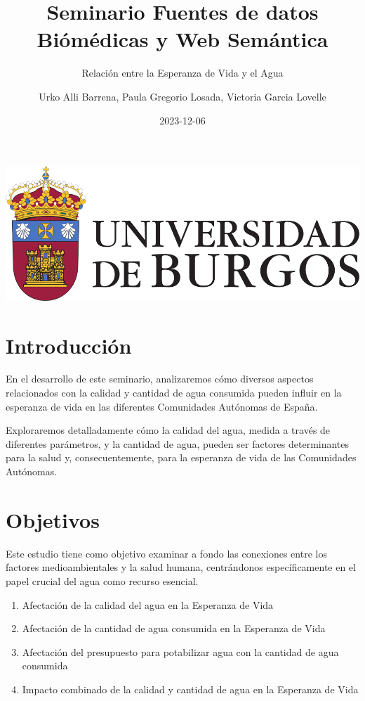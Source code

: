 \documentclass[
]{article}
\title{Seminario Fuentes de datos Biómédicas y Web Semántica}
\subtitle{Relación entre la Esperanza de Vida y el Agua}
\author{Urko Alli Barrena, Paula Gregorio Losada, Victoria Garcia
Lovelle}
\date{2023-12-06}
\providecommand{\tightlist}{%
  \setlength{\itemsep}{0pt}\setlength{\parskip}{0pt}}
\begin{document}
\maketitle

{
\setcounter{tocdepth}{6}
\tableofcontents
}
\includegraphics{INPUT/escudo_ubu.jpg}

\hypertarget{introducciuxf3n}{%
\section{Introducción}\label{introducciuxf3n}}

En el desarrollo de este seminario, analizaremos cómo diversos aspectos
relacionados con la calidad y cantidad de agua consumida pueden influir
en la esperanza de vida en las diferentes Comunidades Autónomas de
España.

Exploraremos detalladamente cómo la calidad del agua, medida a través de
diferentes parámetros, y la cantidad de agua, pueden ser factores
determinantes para la salud y, consecuentemente, para la esperanza de
vida de las Comunidades Autónomas.

\hypertarget{objetivos}{%
\section{Objetivos}\label{objetivos}}

Este estudio tiene como objetivo examinar a fondo las conexiones entre
los factores medioambientales y la salud humana, centrándonos
específicamente en el papel crucial del agua como recurso esencial.

\begin{enumerate}
\def\labelenumi{\arabic{enumi}.}
\tightlist
\item
  Afectación de la calidad del agua en la Esperanza de Vida
\item
  Afectación de la cantidad de agua consumida en la Esperanza de Vida
\item
  Afectación del presupuesto para potabilizar agua con la cantidad de
  agua consumida
\item
  Impacto combinado de la calidad y cantidad de agua en la Esperanza de
  Vida
\end{enumerate}
\end{document}
